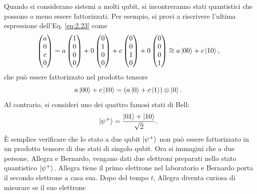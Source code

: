 Quando si considerano sistemi a molti qubit, si incontreranno stati quantistici 
che possono o meno essere fattorizzati. Per esempio, si provi a riscrivere 
l'ultima espressione dell'Eq. \ref{eq:2.23} come 
\begin{equation} \label{eq:2.24}
    \begin{pmatrix}
        a\\0\\c\\0
    \end{pmatrix}
    = a 
    \begin{pmatrix}
        1\\0\\0\\0
    \end{pmatrix}
    + 0 
    \begin{pmatrix}
        0\\1\\0\\0
    \end{pmatrix}
    + c 
    \begin{pmatrix}
        0\\0\\1\\0
    \end{pmatrix}
    + 0 
    \begin{pmatrix}
        0\\0\\0\\1
    \end{pmatrix}
    \cong a \ket{00} + c \ket{10}, 
\end{equation}
che può essere fattorizzato nel prodotto tensore 
\begin{equation} \label{eq:2.25}
    a \ket{00} + c \ket{10} = (a \ket{0} + c \ket{1}) \otimes \ket{0}.
\end{equation}
Al contrario, si consideri uno dei quattro famosi stati di Bell: 
\begin{equation} \label{eq:2.26}
    \ket{\psi^+} = \frac{\ket{01}+\ket{10}}{\sqrt{2}}.
\end{equation}
È semplice verificare che lo stato a due qubit $\ket{\psi^+}$ non può essere 
fattorizzato in un prodotto tensore di due stati di singolo qubit. Ora si 
immagini che a due persone, Allegra e Bernardo, vengano dati due elettroni 
preparati nello stato quantistico $\ket{\psi^+}$. Allegra tiene il primo 
elettrone nel laboratorio e Bernardo porta il secondo elettrone a casa sua. 
Dopo del tempo $t$, Allegra diventa curiosa di misurare se il suo elettrone 
